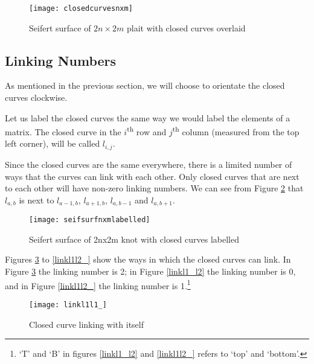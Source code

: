 \documentclass[10pt,a4paper]{report}
\theoremstyle{definition}
\theoremstyle{remark}
\theoremstyle{example}
\begin{document}
 \begin{figure}[H]
\centering
\graphicspath{{/Users/Imogen/Desktop/seifertimages/lapath/}}
\texttt{[image: closedcurvesnxm]}
\caption{Seifert surface of $2n\times2m$ plait with closed curves overlaid}
\label{closedcurvesnxm}
\end{figure}

 
\subsection{Linking Numbers} \label{linkingnumbers}

  As mentioned in the previous section, we will choose to orientate the closed curves clockwise.
      
  Let us label the closed curves the same way we would label the elements of a matrix. The closed curve in the $i$\textsuperscript{th} row and $j$\textsuperscript{th} column (measured from the top left corner), will be called $l_{i,j}$.

 Since the closed curves are the same everywhere, there is a limited number of ways that the curves can link with each other. Only closed curves that are next to each other will have non-zero linking numbers. We can see from Figure \ref{seifsurfnxmlabelled} that $ l_{a,b}$ is next to $ l_{a-1,b}$, $ l_{a+1,b}$, $ l_{a,b-1}$ and $ l_{a,b+1}$. 
 
\begin{figure}[H]
\centering
\graphicspath{{/Users/Imogen/Desktop/seifertimages/lapath/}}
\texttt{[image: seifsurfnxmlabelled]}
\caption{Seifert surface of 2nx2m knot with closed curves labelled}
\label{seifsurfnxmlabelled}
\end{figure}
 
 Figures \ref{linkl1l1_} to \ref{linkl1l2_} show the ways in which the closed curves can link. In Figure \ref{linkl1l1_} the linking number is 2; in Figure \ref{linkl1_l2} the linking number is 0, and in Figure \ref{linkl1l2_} the linking number is 1.\footnote{`T' and `B' in figures \ref{linkl1_l2} and \ref{linkl1l2_} refers to `top' and `bottom'.}

\begin{figure}[H]
\centering
\graphicspath{{/Users/Imogen/Desktop/seifertimages/lapath/}}
\texttt{[image: linkl1l1\_]}
\caption{Closed curve linking with itself}
\label{linkl1l1_}
\end{figure}
\end{document}
